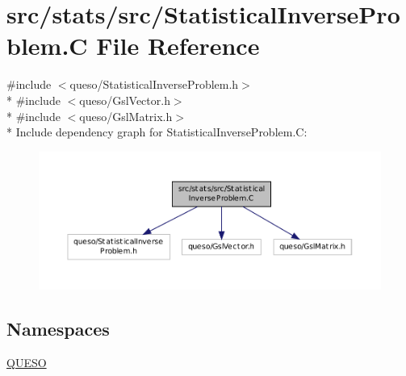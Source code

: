 \hypertarget{_statistical_inverse_problem_8_c}{\section{src/stats/src/\-Statistical\-Inverse\-Problem.C File Reference}
\label{_statistical_inverse_problem_8_c}
}
{\ttfamily \#include $<$queso/\-Statistical\-Inverse\-Problem.\-h$>$}\\*
{\ttfamily \#include $<$queso/\-Gsl\-Vector.\-h$>$}\\*
{\ttfamily \#include $<$queso/\-Gsl\-Matrix.\-h$>$}\\*
Include dependency graph for Statistical\-Inverse\-Problem.\-C\-:
\nopagebreak
\begin{figure}[H]
\begin{center}
\leavevmode
\includegraphics[width=350pt]{_statistical_inverse_problem_8_c__incl}
\end{center}
\end{figure}
\subsection*{Namespaces}
\begin{DoxyCompactItemize}
\item 
\hyperlink{namespace_q_u_e_s_o}{Q\-U\-E\-S\-O}
\end{DoxyCompactItemize}
